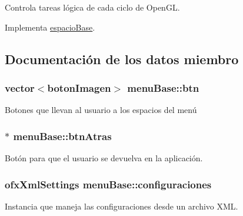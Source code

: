 Controla tareas lógica de cada ciclo de Open\+G\+L. 



Implementa \hyperlink{classespacio_base_a9b94b1106cd478dd78bc42078a36d013}{espacio\+Base}.



\subsection{Documentación de los datos miembro}
\hypertarget{classmenu_base_a6de979e3389d5918db62c75d886161d9}{}
\subsubsection[{btn}]{\setlength{\rightskip}{0pt plus 5cm}vector$<${\bf boton\+Imagen}$>$ menu\+Base\+::btn\hspace{0.3cm}{\ttfamily [protected]}}\label{classmenu_base_a6de979e3389d5918db62c75d886161d9}


Botones que llevan al usuario a los espacios del menú 

\hypertarget{classmenu_base_a28cf020839a96b7793388baf8a9e054d}{}
\subsubsection[{btn\+Atras}]{$\ast$ menu\+Base\+::btn\+Atras\hspace{0.3cm}{\ttfamily [protected]}}\label{classmenu_base_a28cf020839a96b7793388baf8a9e054d}


Botón para que el usuario se devuelva en la aplicación. 

\hypertarget{classmenu_base_a07ca6fd4669759542b11d31eada55403}{}
\subsubsection[{configuraciones}]{\setlength{\rightskip}{0pt plus 5cm}ofx\+Xml\+Settings menu\+Base\+::configuraciones\hspace{0.3cm}{\ttfamily [protected]}}\label{classmenu_base_a07ca6fd4669759542b11d31eada55403}


Instancia que maneja las configuraciones desde un archivo X\+M\+L. 


